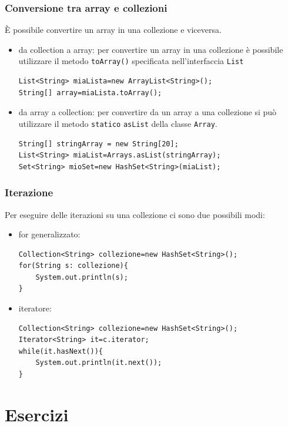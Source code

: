 \documentclass{article}
\begin{document}
\subsubsection{Conversione tra array e collezioni}
\`E possibile convertire un array in una collezione e viceversa.
\begin{itemize}
\item da collection a array: per convertire un array in una collezione \`e possibile utilizzare il metodo \texttt{toArray()} specificata nell'interfaccia \texttt{List}
\begin{lstlisting}
List<String> miaLista=new ArrayList<String>();
String[] array=miaLista.toArray();
\end{lstlisting}
\end{itemize}
\begin{itemize}
\item da array a collection: per convertire da un array a una collezione si pu\`o utilizzare il metodo \texttt{statico} \texttt{asList} della classe \texttt{Array}.
\begin{lstlisting}
String[] stringArray = new String[20];
List<String> miaList=Arrays.asList(stringArray);
Set<String> mioSet=new HashSet<String>(miaList);
\end{lstlisting}
\end{itemize}


\subsubsection{Iterazione}
Per eseguire delle iterazioni su una collezione ci sono due possibili modi:
\begin{itemize}
\item for generalizzato:
\begin{lstlisting}
Collection<String> collezione=new HashSet<String>();
for(String s: collezione){
    System.out.println(s);
}
\end{lstlisting}
\item iteratore:
\begin{lstlisting}
Collection<String> collezione=new HashSet<String>();
Iterator<String> it=c.iterator;
while(it.hasNext()){
    System.out.println(it.next());
}
\end{lstlisting}
\end{itemize}


\section{Esercizi}
\end{document}

